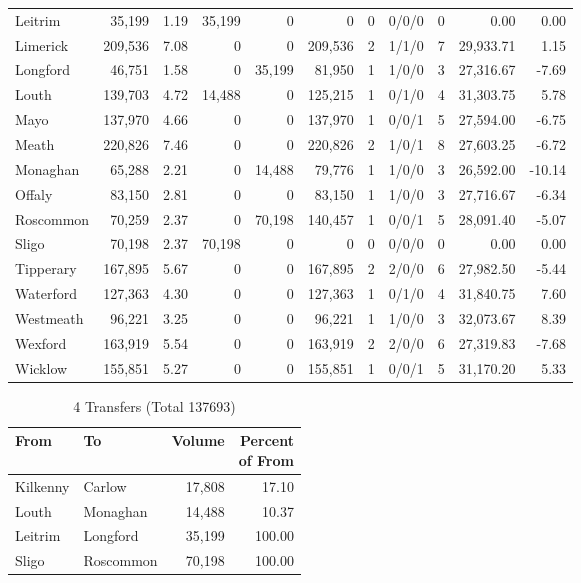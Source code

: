 \documentclass[a4paper]{article}
\begin{document}
\begin{longtable}{lrrrrrrlrrr}
Leitrim&35,199& 1.19&35,199&0&0&0&0/0/0&0& 0.00& 0.00\\ 
Limerick&209,536& 7.08&0&0&209,536&2&1/1/0&7&29,933.71& 1.15\\ 
Longford&46,751& 1.58&0&35,199&81,950&1&1/0/0&3&27,316.67&-7.69\\ 
Louth&139,703& 4.72&14,488&0&125,215&1&0/1/0&4&31,303.75& 5.78\\ 
Mayo&137,970& 4.66&0&0&137,970&1&0/0/1&5&27,594.00&-6.75\\ 
Meath&220,826& 7.46&0&0&220,826&2&1/0/1&8&27,603.25&-6.72\\ 
Monaghan&65,288& 2.21&0&14,488&79,776&1&1/0/0&3&26,592.00&-10.14\\ 
Offaly&83,150& 2.81&0&0&83,150&1&1/0/0&3&27,716.67&-6.34\\ 
Roscommon&70,259& 2.37&0&70,198&140,457&1&0/0/1&5&28,091.40&-5.07\\ 
Sligo&70,198& 2.37&70,198&0&0&0&0/0/0&0& 0.00& 0.00\\ 
Tipperary&167,895& 5.67&0&0&167,895&2&2/0/0&6&27,982.50&-5.44\\ 
Waterford&127,363& 4.30&0&0&127,363&1&0/1/0&4&31,840.75& 7.60\\ 
Westmeath&96,221& 3.25&0&0&96,221&1&1/0/0&3&32,073.67& 8.39\\ 
Wexford&163,919& 5.54&0&0&163,919&2&2/0/0&6&27,319.83&-7.68\\ 
Wicklow&155,851& 5.27&0&0&155,851&1&0/0/1&5&31,170.20& 5.33\\ 
\end{longtable}

\begin{table}[htbp]
\caption{4 Transfers (Total 137693)}
\centering
\begin{tabular}{llrr} \toprule
From &To &Volume &\shortstack{Percent\\of From} \\ \midrule
Kilkenny&Carlow&17,808&17.10\\ 
Louth&Monaghan&14,488&10.37\\ 
Leitrim&Longford&35,199&100.00\\ 
Sligo&Roscommon&70,198&100.00\\ 
\bottomrule
\end{tabular}
\end{table}
\end{document}
